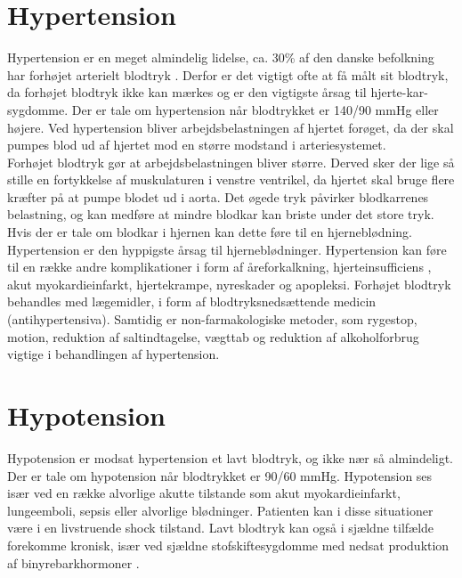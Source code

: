 \section{Hypertension} 
Hypertension er en meget almindelig lidelse, ca. 30\% af den danske befolkning har forhøjet arterielt blodtryk \cite{Hypertension}. Derfor er det vigtigt ofte at få målt sit blodtryk, da forhøjet blodtryk ikke kan mærkes og er den vigtigste årsag til hjerte-kar-sygdomme. 
Der er tale om hypertension når blodtrykket er 140/90 mmHg eller højere.
Ved hypertension bliver arbejdsbelastningen af hjertet forøget, da der skal pumpes blod ud af hjertet mod en større modstand i arteriesystemet. \\
Forhøjet blodtryk gør at arbejdsbelastningen bliver større. Derved sker der lige så stille en fortykkelse af muskulaturen i venstre ventrikel, da hjertet skal bruge flere kræfter på at pumpe blodet ud i aorta. 
Det øgede tryk påvirker blodkarrenes belastning, og kan medføre at mindre blodkar kan briste under det store tryk. Hvis der er tale om blodkar i hjernen kan dette føre til en hjerneblødning. Hypertension er den hyppigste årsag til hjerneblødninger.
Hypertension kan føre til en række andre komplikationer i form af åreforkalkning, hjerteinsufficiens \cite{Hjerteinsufficiens}, akut myokardieinfarkt, hjertekrampe, nyreskader og apopleksi.
Forhøjet blodtryk behandles med lægemidler, i form af blodtryksnedsættende medicin (antihypertensiva). Samtidig er non-farmakologiske metoder, som rygestop, motion, reduktion af saltindtagelse, vægttab og reduktion af alkoholforbrug vigtige i behandlingen af hypertension. 

\section{Hypotension} 
Hypotension er modsat hypertension et lavt blodtryk, og ikke nær så almindeligt. Der er tale om hypotension når blodtrykket er 90/60 mmHg. Hypotension ses især ved en række alvorlige akutte tilstande som akut myokardieinfarkt, lungeemboli, sepsis eller alvorlige blødninger. Patienten kan i disse situationer være i en livstruende shock tilstand. Lavt blodtryk kan også i sjældne tilfælde forekomme kronisk, især ved sjældne stofskiftesygdomme med nedsat produktion af binyrebarkhormoner \cite{Hypotension}.   